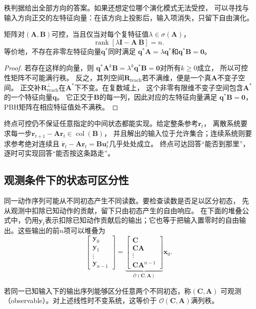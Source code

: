 秩判据给出全部方向的答案。如果还想定位哪个演化模式无法受控，
可以寻找与输入方向正交的左特征向量：在该方向上投影后，输入项消失，只留下自由演化。
\begin{theorem}
\label{thm:control-pbh-controllability}
矩阵对$(\bm A,\bm B)$可控，当且仅当对每个复特征值$\lambda\in\sigma(\bm A)$，
\begin{equation}
  \operatorname{rank}[\lambda\bm I-\bm A\ \bm B]=n.
  \label{eq:control-pbh-controllability}
\end{equation}
等价地，不存在非零左特征向量$\bm q^\ast$同时满足
$\bm q^\ast\bm A=\lambda\bm q^\ast$和$\bm q^\ast\bm B=\bm0$。
\end{theorem}
\begin{proof}
若存在这样的向量，则
$\bm q^\ast\bm A^k\bm B=\lambda^k\bm q^\ast\bm B=\bm0$对所有$k\geq0$成立，
所以可控性矩阵不可能满行秩。
反之，其列空间$\bm R_{\mathrm{reach}}$若不满维，便是一个真$\bm A$不变子空间。
正交补$\bm R_{\mathrm{reach}}^{\perp}$在$\bm A^\ast$下不变。在复数域上，
这个非零有限维不变子空间包含$\bm A^\ast$的一个特征向量$\bm q$。
它正交于$\bm B$的每一列，因此对应的左特征向量满足
$\bm q^\ast\bm B=\bm0$，PBH矩阵在相应特征值处不满秩。
\end{proof}

终点可控仍不保证任意指定的中间状态都能实现。给定整条参考$\bm r_t$，
离散系统要求每一步$\bm r_{t+1}-\bm A\bm r_t\in\operatorname{col}(\bm B)$，
并且解出的输入位于允许集合；连续系统则要求参考绝对连续且
$\dot{\bm r}_t-\bm A\bm r_t=\bm B\bm u_t^r$几乎处处成立。
终点可达回答“能否到那里”，逐时可实现回答“能否按这条路走”。

\subsection{观测条件下的状态可区分性}
同一动作序列可能从不同初态产生不同读数。要检查读数是否足以区分初态，
先从观测中扣除已知动作的贡献，留下只由初态产生的自由响应。
在下面的堆叠公式中，仍用$\bm y_t$表示扣除已知动作贡献后的输出；它也等于把输入置零时的自由输出。这些输出的前$n$项可以堆叠为
\begin{equation}
  \begin{bmatrix}\bm y_0\\\bm y_1\\\vdots\\\bm y_{n-1}\end{bmatrix}
  =
  \underbrace{\begin{bmatrix}
    \bm C\\\bm C\bm A\\\vdots\\\bm C\bm A^{n-1}
  \end{bmatrix}}_{\mathcal O(\bm C,\bm A)}\bm x_0.
  \label{eq:control-observability-matrix}
\end{equation}
\begin{definition}[可观测性]
\label{def:control-observability-detectability}
若同一已知输入下的输出序列能够区分任意两个不同初态，称$(\bm C,\bm A)$
可观测（observable）。对上述线性时不变系统，这等价于
$\mathcal O(\bm C,\bm A)$满列秩。
\end{definition}

